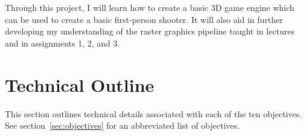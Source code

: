 \documentclass {article}
\begin{document}
Through this project, I will learn how to create a basic 3D game engine which can be used to create a basic first-person shooter. It will also aid in further developing my understanding of the raster graphics pipeline taught in lectures and in assignments 1, 2, and 3.











\newpage

\section{Technical Outline}\label{sec:tech}
This section outlines technical details associated with each of the ten objectives. See section~\ref{sec:objectives} for an abbreviated list of objectives.
\end{document}
